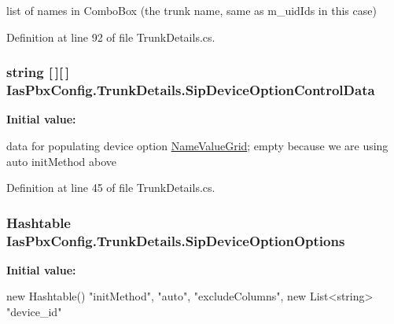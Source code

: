 list of names in ComboBox (the trunk name, same as m\_\-uidIds in this case) 

Definition at line 92 of file TrunkDetails.cs.\hypertarget{class_ias_pbx_config_1_1_trunk_details_a63923565253ba942384b5e2bb38a3df7}{
\subsubsection[{SipDeviceOptionControlData}]{\setlength{\rightskip}{0pt plus 5cm}string \mbox{[}$\,$\mbox{]}\mbox{[}$\,$\mbox{]} {\bf IasPbxConfig.TrunkDetails.SipDeviceOptionControlData}}}
\label{class_ias_pbx_config_1_1_trunk_details_a63923565253ba942384b5e2bb38a3df7}
{\bfseries Initial value:}
\begin{DoxyCode}
 
        {
        }
\end{DoxyCode}


data for populating device option \hyperlink{class_ias_pbx_config_1_1_name_value_grid}{NameValueGrid}; empty because we are using auto initMethod above 

Definition at line 45 of file TrunkDetails.cs.\hypertarget{class_ias_pbx_config_1_1_trunk_details_a0647e696eac396ee74192f30deee4709}{
\subsubsection[{SipDeviceOptionOptions}]{\setlength{\rightskip}{0pt plus 5cm}Hashtable {\bf IasPbxConfig.TrunkDetails.SipDeviceOptionOptions}}}
\label{class_ias_pbx_config_1_1_trunk_details_a0647e696eac396ee74192f30deee4709}
{\bfseries Initial value:}
\begin{DoxyCode}
 new Hashtable()
        {
            {"initMethod", "auto"},
            {"excludeColumns", new List<string> {"device_id"}}
        }
\end{DoxyCode}


